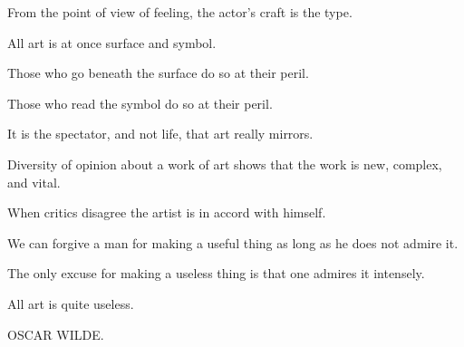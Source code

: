\documentclass{article}
\begin{document}
From the point of view of feeling, the actor's craft is the type.

All art is at once surface and symbol.

Those who go beneath the surface do so at their peril.

Those who read the symbol do so at their peril.

It is the spectator, and not life, that art really mirrors.

Diversity of opinion about a work of art shows that the work is new, complex, and vital.

When critics disagree the artist is in accord with himself.

We can forgive a man for making a useful thing as long as he does not admire it.

The only excuse for making a useless thing is that one admires it intensely.

All art is quite useless.

OSCAR WILDE.
\end{document}
